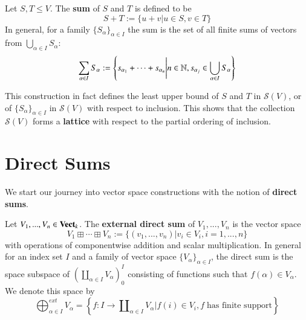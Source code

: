 \begin{definition}
    Let $S,T \leq V$. The \textbf{sum} of $S$ and $T$ is defined to be \begin{equation*}
        S+T := \{u+v|u \in S,v \in T\}
    \end{equation*}
    In general, for a family $\{S_{\alpha}\}_{\alpha \in I}$ the sum is the set of all finite sums of vectors from $\bigcup_{\alpha \in I}S_{\alpha}$: \begin{equation*}
        \sum_{\alpha \in I}S_{\alpha} := \left\{s_{\alpha_1}+\cdots + s_{\alpha_n}\Bigg\vert n \in \mathbb N, s_{\alpha_j} \in \bigcup_{\alpha \in I}S_{\alpha}\right\}
    \end{equation*}
\end{definition}

This construction in fact defines the least upper bound of $S$ and $T$ in $\mathcal{S}(V)$, or of $\{S_{\alpha}\}_{\alpha \in I}$ in $\mathcal{S}(V)$ with respect to inclusion. This shows that the collection $\mathcal{S}(V)$ forms a \textbf{lattice} with respect to the partial ordering of inclusion. 

\section{Direct Sums}\label{sec:DirectSum}

We start our journey into vector space constructions with the notion of \textbf{direct sums}.

\begin{definition}
    Let $V_1,...,V_n \in \normalfont\textbf{Vect}_{k}$. The \textbf{external direct sum} of $V_1,...,V_n$ is the vector space \begin{equation*}
        V_1\boxplus\cdots \boxplus V_n := \{(v_1,...,v_n)|v_i \in V_i,i = 1,...,n\}
    \end{equation*}
    with operations of componentwise addition and scalar multiplication. In general for an index set $I$ and a family of vector space $\{V_{\alpha}\}_{\alpha \in I}$, the direct sum is the space subspace of $(\amalg_{\alpha \in I}V_{\alpha})^I_0$ consisting of functions such that $f(\alpha) \in V_{\alpha}$. We denote this space by \begin{equation*}
        \bigoplus_{\alpha \in I}^{ext}V_{\alpha} = \left\{f:I\rightarrow \amalg_{\alpha \in I}V_{\alpha}\Bigg\vert f(i) \in V_i,f\;\text{has finite support}\right\}
    \end{equation*}
\end{definition}

